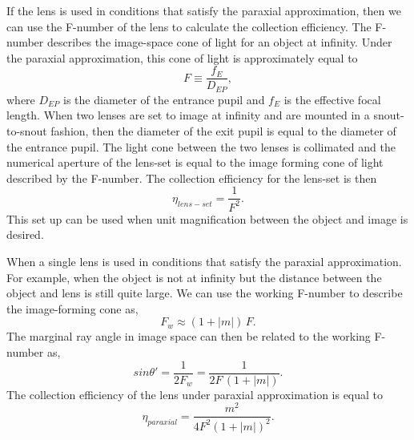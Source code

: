If the lens is used in conditions that satisfy the paraxial approximation, then we can use the F-number of the lens to calculate the collection efficiency.  The F-number describes the image-space cone of light for an object at infinity.  Under the paraxial approximation, this cone of light is approximately equal to~\citep{greivenkampfieldguide}
%
\begin{equation}
F \equiv \frac{f_E}{D_{EP}},
\end{equation}
%
where $D_{EP}$ is the diameter of the entrance pupil and $f_E$ is the effective focal length.  When two lenses are set to image at infinity and are mounted in a snout-to-snout fashion, then the diameter of the exit pupil is equal to the diameter of the entrance pupil.  The light cone between the two lenses is collimated and the numerical aperture of the lens-set is equal to the image forming cone of light described by the F-number.  The collection efficiency for the lens-set is then
%
\begin{equation}
\eta_{lens-set} = \frac{1}{F^2}.
\end{equation}
%
This set up can be used when unit magnification between the object and image is desired.

When a single lens is used in conditions that satisfy the paraxial approximation.  For example, when the object is not at infinity but the distance between the object and lens is still quite large.  We can use the working F-number to describe the image-forming cone as,
%
\begin{equation}
F_{w} \approx (1 + \lvert m \rvert) \, F.
\end{equation}
%
The marginal ray angle in image space can then be related to the working F-number as,
%
\begin{equation}
sin \theta' = \frac{1}{2 F_{w}} = \frac{1}{2 F \, (1+ \lvert m \rvert)}.
\end{equation}
%
%
The collection efficiency of the lens under paraxial approximation is equal to
%
\begin{equation}
\eta_{paraxial} = \frac{m^2}{4 F^2(1 + |m|)^2}.
\end{equation}
%

